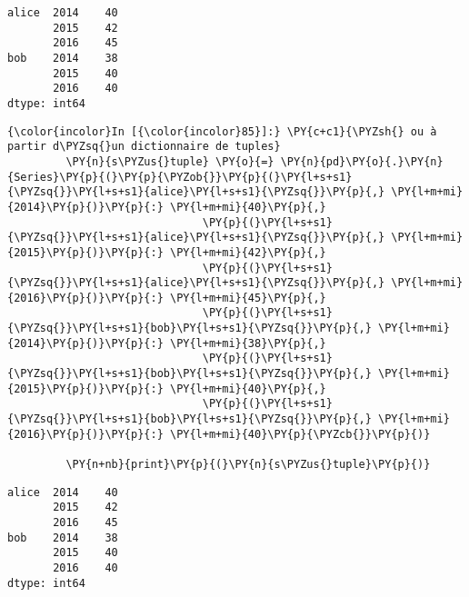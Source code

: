    \begin{Verbatim}[commandchars=\\\{\}]
alice  2014    40
       2015    42
       2016    45
bob    2014    38
       2015    40
       2016    40
dtype: int64

    \end{Verbatim}

    \begin{Verbatim}[commandchars=\\\{\}]
{\color{incolor}In [{\color{incolor}85}]:} \PY{c+c1}{\PYZsh{} ou à partir d\PYZsq{}un dictionnaire de tuples}
         \PY{n}{s\PYZus{}tuple} \PY{o}{=} \PY{n}{pd}\PY{o}{.}\PY{n}{Series}\PY{p}{(}\PY{p}{\PYZob{}}\PY{p}{(}\PY{l+s+s1}{\PYZsq{}}\PY{l+s+s1}{alice}\PY{l+s+s1}{\PYZsq{}}\PY{p}{,} \PY{l+m+mi}{2014}\PY{p}{)}\PY{p}{:} \PY{l+m+mi}{40}\PY{p}{,}
                              \PY{p}{(}\PY{l+s+s1}{\PYZsq{}}\PY{l+s+s1}{alice}\PY{l+s+s1}{\PYZsq{}}\PY{p}{,} \PY{l+m+mi}{2015}\PY{p}{)}\PY{p}{:} \PY{l+m+mi}{42}\PY{p}{,}
                              \PY{p}{(}\PY{l+s+s1}{\PYZsq{}}\PY{l+s+s1}{alice}\PY{l+s+s1}{\PYZsq{}}\PY{p}{,} \PY{l+m+mi}{2016}\PY{p}{)}\PY{p}{:} \PY{l+m+mi}{45}\PY{p}{,}
                              \PY{p}{(}\PY{l+s+s1}{\PYZsq{}}\PY{l+s+s1}{bob}\PY{l+s+s1}{\PYZsq{}}\PY{p}{,} \PY{l+m+mi}{2014}\PY{p}{)}\PY{p}{:} \PY{l+m+mi}{38}\PY{p}{,}
                              \PY{p}{(}\PY{l+s+s1}{\PYZsq{}}\PY{l+s+s1}{bob}\PY{l+s+s1}{\PYZsq{}}\PY{p}{,} \PY{l+m+mi}{2015}\PY{p}{)}\PY{p}{:} \PY{l+m+mi}{40}\PY{p}{,}
                              \PY{p}{(}\PY{l+s+s1}{\PYZsq{}}\PY{l+s+s1}{bob}\PY{l+s+s1}{\PYZsq{}}\PY{p}{,} \PY{l+m+mi}{2016}\PY{p}{)}\PY{p}{:} \PY{l+m+mi}{40}\PY{p}{\PYZcb{}}\PY{p}{)}
         
         \PY{n+nb}{print}\PY{p}{(}\PY{n}{s\PYZus{}tuple}\PY{p}{)}
\end{Verbatim}


    \begin{Verbatim}[commandchars=\\\{\}]
alice  2014    40
       2015    42
       2016    45
bob    2014    38
       2015    40
       2016    40
dtype: int64

    \end{Verbatim}

